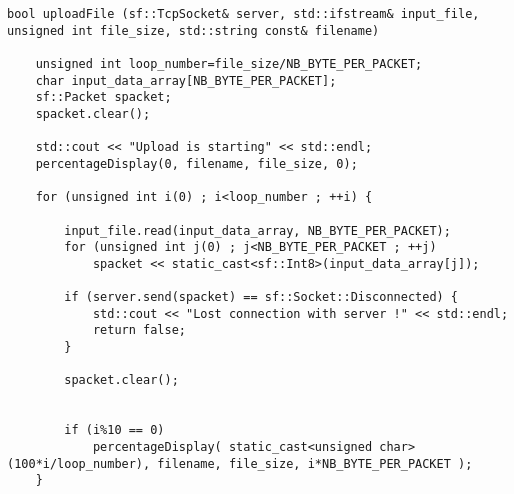 \begin{lstlisting}
bool uploadFile (sf::TcpSocket& server, std::ifstream& input_file, unsigned int file_size, std::string const& filename)

	unsigned int loop_number=file_size/NB_BYTE_PER_PACKET;
	char input_data_array[NB_BYTE_PER_PACKET];
	sf::Packet spacket;
	spacket.clear();

	std::cout << "Upload is starting" << std::endl;
	percentageDisplay(0, filename, file_size, 0);

	for (unsigned int i(0) ; i<loop_number ; ++i) {

		input_file.read(input_data_array, NB_BYTE_PER_PACKET);
		for (unsigned int j(0) ; j<NB_BYTE_PER_PACKET ; ++j)
			spacket << static_cast<sf::Int8>(input_data_array[j]);

		if (server.send(spacket) == sf::Socket::Disconnected) {
			std::cout << "Lost connection with server !" << std::endl;
			return false;
		}

		spacket.clear();


		if (i%10 == 0)
			percentageDisplay( static_cast<unsigned char>(100*i/loop_number), filename, file_size, i*NB_BYTE_PER_PACKET );
	}
\end{lstlisting}
